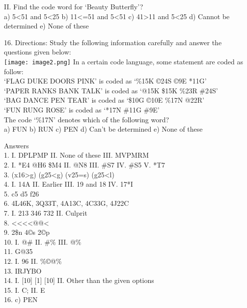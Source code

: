 \documentclass[
]{article}
\begin{document}
II. Find the code word for ‘Beauty Butterfly’?\\
a) 5<51 and 5<25 b) 11<=51 and 5<51 c) 41>11 and 5<25
d) Cannot be determined e) None of these

16. Directions: Study the following information carefully and answer the questions given
below:\\
\texttt{[image: image2.png]}
In a certain code language, some statement are coded as follow:\\
‘FLAG DUKE DOORS PINK’ is coded as ‘\%15K ©24S ©9E *11G’\\
‘PAPER RANKS BANK TALK’ is coded as ‘@15K \$15K \%23R \#24S’\\
‘BAG DANCE PEN TEAR’ is coded as ‘\$10G ©10E \%17N @22R’\\
‘FUN RUNG ROSE’ is coded as ‘*17N \#11G \#9E’\\

The code ‘\%17N’ denotes which of the following word?\\
a) FUN b) RUN c) PEN d) Can’t be determined e) None of these

Answers\\
1. I. DPLPMP \hspace{1.5mm}II. None of these \hspace{1.5mm}III. MVPMRM\\
2. I. *E4 @H6 \$M4 \hspace{1.5mm}II. @N8 \hspace{1.5mm}III. \#S7 \hspace{1.5mm}IV. \#S5 \hspace{1.5mm}V. *T7\\
3. (x16>g) (g25<g) (v25=s) (g25<l)\\
4. I. 14A \hspace{1.5mm}II. Earlier \hspace{1.5mm}III. 19 and 18 \hspace{1.5mm}IV. 17*I\\
5. c5 d5 f26\\
6. 4L46K, 3Q33T, 4A13C, 4C33G, 4J22C\\
7. I. 213 346 732 \hspace{1.5mm}II. Culprit\\
8. <<<<@@<\\
9. 2\$n 4©s 2©p\\
10. I. @\# \hspace{1.5mm}II. \#\% \hspace{1.5mm}III. @\%\\
11. G@35\\
12. I. 96 \hspace{1.5mm}II. \%©@\%\\
13. IRJYBO\\
14. I. [10] [1] [10] \hspace{1.5mm}II. Other than the given options\\
15. I. C; \hspace{1.5mm}II. E\\
16. c) PEN\\
\end{document}
